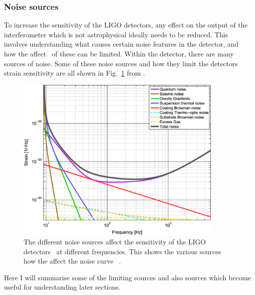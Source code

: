 \subsubsection{\label{intro:detector:noise}Noise sources}

To increase the sensitivity of the \gls{LIGO} detectors, any effect on the
output of the interferometer which is not astrophysical ideally needs to be
reduced.  This involves understanding what causes certain noise features in the
detector, and how the affect~ of
these can be limited.  Within the detector, there are many sources of noise.
Some of these noise sources and how they limit the detectors strain sensitivity
are all shown in Fig.~\ref{detectors:noisesensitivity} from
\citep{aasi2015AdvancedLIGO}.

\begin{figure}[h]
    \centering
    \includegraphics[width=0.9\textwidth]{C1_intro/noise_sensitivity.jpg}
    \caption[Example strain sensitivity curves for different noise sources in
\gls{LIGO}.]{The different noise sources affect the sensitivity of the
\gls{LIGO} detectors~ at different frequencies. This shows the various sources
how the affect the noise curve~ \citep{aasi2015AdvancedLIGO}.}
\label{detectors:noisesensitivity} 
\end{figure}

Here I will summarise some of the limiting sources and also sources which
become useful for understanding later sections.

